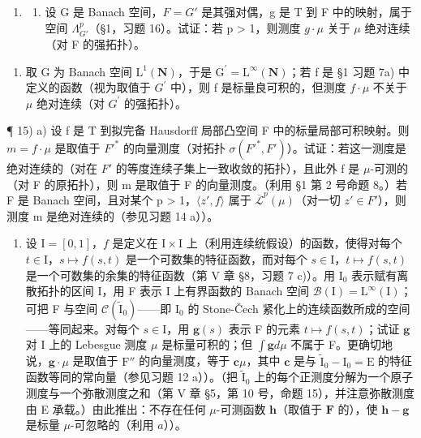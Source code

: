 \begin{enumerate}
\def\labelenumi{\arabic{enumi})}
\setcounter{enumi}{13}
\tightlist
\item
  \begin{enumerate}
  \def\labelenumii{\alph{enumii})}
  \tightlist
  \item
    设 G 是 Banach 空间，\(F = G'\) 是其强对偶，g 是 T 到 F 中的映射，属于空间 \(\Lambda_{G'}^{p}\)（§1，习题 16）。试证：若 p \textgreater{} 1，则测度 \(g \cdot \mu\) 关于 \(\mu\) 绝对连续（对 F 的强拓扑）。
  \end{enumerate}
\end{enumerate}

\begin{enumerate}
\def\labelenumi{\alph{enumi})}
\setcounter{enumi}{1}
\tightlist
\item
  取 G 为 Banach 空间 \(\mathrm{L}^{1}(\mathbf{N})\)，于是 \(\mathrm{G}^{\prime}=\mathrm{L}^{\infty}(\mathbf{N})\)；若 f 是 §1 习题 7a) 中定义的函数（视为取值于 \(G^{\prime}\) 中），则 f 是标量良可积的，但测度 \(f\cdot\mu\) 不关于 \(\mu\) 绝对连续（对 \(G^{\prime}\) 的强拓扑）。
\end{enumerate}

¶ 15) a) 设 f 是 T 到拟完备 Hausdorff 局部凸空间 F 中的标量局部可积映射。则 \(m = f \cdot \mu\) 是取值于 \(F'^{*}\) 的向量测度（对拓扑 \(\sigma(F'^{*}, F')\)）。试证：若这一测度是绝对连续的（对在 \(F'\) 的等度连续子集上一致收敛的拓扑），且此外 f 是 \(\mu\)-可测的（对 F 的原拓扑），则 m 是取值于 F 的向量测度。（利用 §1 第 2 号命题 8。）若 F 是 Banach 空间，且对某个 p \textgreater{} 1，\(\langle z', f \rangle\) 属于 \(\overline{\mathcal{L}}^{p}(\mu)\)（对一切 \(z' \in F'\)），则测度 m 是绝对连续的（参见习题 14 a））。

\begin{enumerate}
\def\labelenumi{\alph{enumi})}
\setcounter{enumi}{1}
\tightlist
\item
  设 \(\mathrm{I} = [0,1]\)，\(f\) 是定义在 \(\mathrm{I} \times \mathrm{I}\) 上（利用连续统假设）的函数，使得对每个 \(t \in \mathrm{I}\)，\(s \mapsto f(s,t)\) 是一个可数集的特征函数，而对每个 \(s \in \mathrm{I}\)，\(t \mapsto f(s,t)\) 是一个可数集的余集的特征函数（第 V 章 §8，习题 7 c)）。用 \(\mathrm{I}_0\) 表示赋有离散拓扑的区间 I，用 F 表示 I 上有界函数的 Banach 空间 \(\mathcal{B}(\mathrm{I}) = \mathrm{L}^\infty(\mathrm{I})\)；可把 F 与空间 \(\mathcal{C}(\widetilde{\mathrm{I}}_0)\)——即 \(\mathrm{I}_0\) 的 Stone-Čech 紧化上的连续函数所成的空间——等同起来。对每个 \(s \in \mathrm{I}\)，用 \(\mathbf{g}(s)\) 表示 F 的元素 \(t \mapsto f(s,t)\)；试证 \(\mathbf{g}\) 对 I 上的 Lebesgue 测度 \(\mu\) 是标量可积的；但 \(\int \mathbf{g} d\mu\) 不属于 F。更确切地说，\(\mathbf{g} \cdot \mu\) 是取值于 \(\mathrm{F}''\) 的向量测度，等于 \(\mathbf{c}\mu\)，其中 \(\mathbf{c}\) 是与 \(\widetilde{\mathrm{I}}_0 - \mathrm{I}_0 = \mathrm{E}\) 的特征函数等同的常向量（参见习题 12 a））。（把 \(\widetilde{\mathrm{I}}_0\) 上的每个正测度分解为一个原子测度与一个弥散测度之和（第 V 章 §5，第 10 号，命题 15），并注意弥散测度由 E 承载。）由此推出：不存在任何 \(\mu\)-可测函数 \(\mathbf{h}\)（取值于 \(\mathbf{F}\) 的），使 \(\mathbf{h} - \mathbf{g}\) 是标量 \(\mu\)-可忽略的（利用 \(a\)））。
\end{enumerate}

